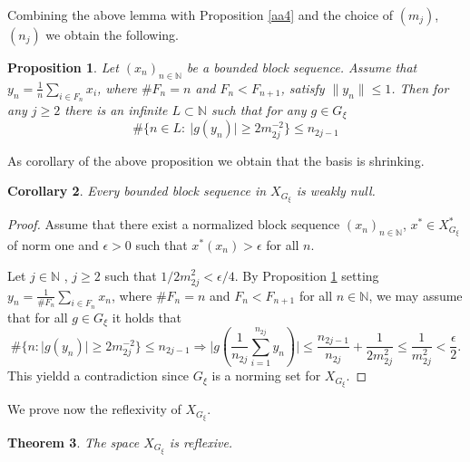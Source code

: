 \documentclass[a4paper]{amsart}
\theoremstyle{plain}
\newtheorem{theorem}{Theorem}[section]
\newtheorem{proposition}[theorem]{Proposition}
\newtheorem{corollary}[theorem]{Corollary}
\newcommand{\N}{\mathbb{N}}
\newcommand{\e}{\epsilon}
\newcommand{\norm}[1][\cdot]{\lVert #1\rVert}
\newcommand{\xn}[1][x]{(#1_{n})_{n\in\N}}
\begin{document}
Combining the above lemma  with Proposition \ref{aa4} and  the choice of $(m_j)$, $(n_j)$
we obtain the following.
\begin{proposition}\label{ris-sss} Let $\xn$ be a bounded block sequence. Assume that $y_{n}=\frac{1}{n}\sum_{i\in
F_{n}}x_i$, where $\# F_{n}=n$  and $F_{n}<F_{n+1}$, satisfy $\norm[y_n]\leq 1$. Then for
any $j\geq 2$ there is an infinite $L\subset\N$ such that for any $g\in G_{\xi}$
$$
\#\{n\in L: \ \vert g(y_n)\vert \geq 2m_{2j}^{-2}\}\leq n_{2j-1}
$$
\end{proposition}
As corollary of the above proposition we obtain that the basis is shrinking.
\begin{corollary}\label{shrinking}
Every bounded block sequence in $X_{G_{\xi}}$ is weakly null.
\end{corollary}
\begin{proof}
Assume that there exist a normalized block sequence $\xn$, $x^{*}\in X_{G_{\xi}}^{*}$ of norm one and $\e>0$ such that
$x^{*}(x_n)>\e$ for all $n$.

Let $j\in\N$ , $j\geq 2$ such that $1/2m_{2j}^2<\e/4$. By Proposition  \ref{ris-sss} setting  $y_{n}=\frac{1}{\# F_{n}}\sum_{i\in F_{n}}x_{n}$,  where
$\#F_{n}=n$ and  $F_{n}<F_{n+1}$ for all $n\in\N$,
we may assume that  for all  $g\in G_{\xi}$ it holds that
\begin{equation}
\#\{n: \vert
g(y_n)\vert\geq 2m_{2j}^{-2}\}\leq n_{2j-1}\Rightarrow
\vert g(\frac{1}{n_{2j}}\sum_{i=1}^{n_{2j}}y_n)\vert\leq \frac{n_{2j-1}}{n_{2j}}+\frac{1 }{2m_{2j}^{2}}\leq \frac{1}{m_{2j}^{2}}<\frac{\e}{2}. 
\end{equation}
This yieldd a contradiction
since   $G_{\xi}$ is a norming set for $X_{G_{\xi}}$.
\end{proof}
We prove now the reflexivity of  $X_{G_{\xi}}$.
\begin{theorem}\label{refl} The space $X_{G_\xi}$ is reflexive.
\end{theorem}
\end{document}

